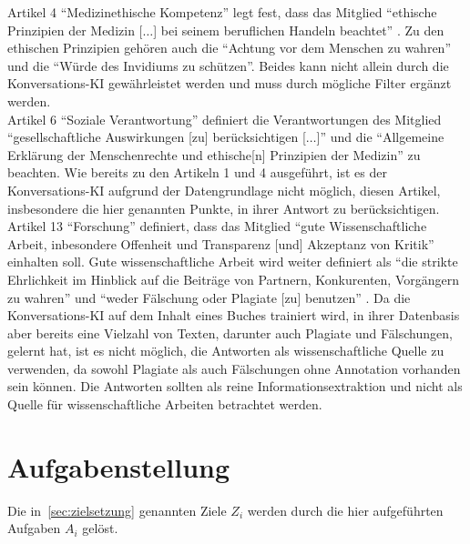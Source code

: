 Artikel 4 \enquote{Medizinethische Kompetenz} legt fest, dass das Mitglied
\enquote{ethische Prinzipien der Medizin [$\dots$] bei seinem beruflichen Handeln beachtet} \citep{gmds_eth}.
Zu den ethischen Prinzipien \citep{gmds_eth} gehören auch die \enquote{Achtung vor dem Menschen zu wahren} und die \enquote{Würde des Invidiums zu schützen}.
Beides kann nicht allein durch die Konversations-KI gewährleistet werden und muss durch mögliche Filter ergänzt werden.\\

Artikel 6 \enquote{Soziale Verantwortung} definiert die Verantwortungen des Mitglied
\enquote{gesellschaftliche Auswirkungen [zu] berücksichtigen [$\dots$]} und die
\enquote{Allgemeine Erklärung der Menschenrechte und ethische[n] Prinzipien der Medizin} \citep{gmds_eth}zu beachten.
Wie bereits zu den Artikeln 1 und 4 ausgeführt, ist es der Konversations-KI aufgrund der Datengrundlage nicht möglich, diesen Artikel, insbesondere die hier genannten Punkte, in ihrer Antwort zu berücksichtigen.\\

Artikel 13 \enquote{Forschung} definiert, dass das Mitglied \enquote{gute Wissenschaftliche Arbeit, inbesondere Offenheit und Transparenz [und] Akzeptanz von Kritik} \citep{gmds_eth} einhalten soll.
Gute wissenschaftliche Arbeit wird weiter definiert als
\enquote{die strikte Ehrlichkeit im Hinblick auf die Beiträge von Partnern, Konkurenten, Vorgängern zu wahren} und \enquote{weder Fälschung oder Plagiate [zu] benutzen} \citep{gmds_eth}.
Da die Konversations-KI auf dem Inhalt eines Buches trainiert wird, in ihrer Datenbasis aber bereits eine Vielzahl von Texten, darunter auch Plagiate und Fälschungen, gelernt hat,
ist es nicht möglich, die Antworten als wissenschaftliche Quelle zu verwenden, da sowohl Plagiate als auch Fälschungen ohne Annotation vorhanden sein können.
Die Antworten sollten als reine Informationsextraktion und nicht als Quelle für wissenschaftliche Arbeiten betrachtet werden.

\section{Aufgabenstellung}

Die in~\ref{sec:zielsetzung} genannten Ziele $Z_i$ werden durch die hier aufgeführten Aufgaben $A_i$ gelöst.

